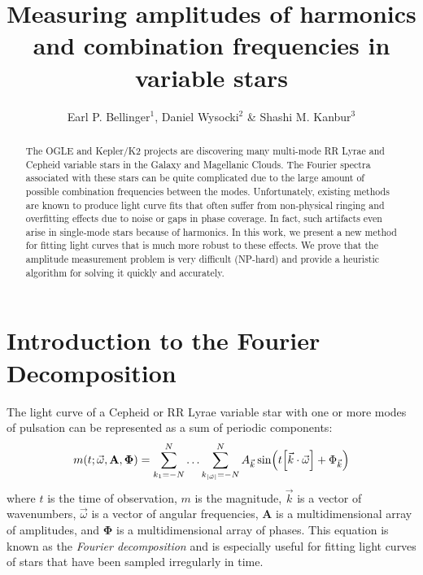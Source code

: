 \documentclass[11pt,twoside]{book}
\begin{document}
\pagestyle{myheadings}
\setcounter{equation}{0}\setcounter{figure}{0}\setcounter{footnote}{0}\setcounter{section}{0}\setcounter{table}{0}\setcounter{page}{1}
\title{Measuring amplitudes of harmonics and combination frequencies in variable stars}
\author{Earl P. Bellinger$^1$, Daniel Wysocki$^2$ \& Shashi M. Kanbur$^3$}

\begin{abstract}
The OGLE and Kepler/K2 projects are discovering many multi-mode RR Lyrae and Cepheid variable stars in the Galaxy and Magellanic Clouds. The Fourier spectra associated with these stars can be quite complicated due to the large amount of possible combination frequencies between the modes. Unfortunately, existing methods are known to produce light curve fits that often suffer from non-physical ringing and overfitting effects due to noise or gaps in phase coverage. In fact, such artifacts even arise in single-mode stars because of harmonics. In this work, we present a new method for fitting light curves that is much more robust to these effects. We prove that the amplitude measurement problem is very difficult (NP-hard) and provide a heuristic algorithm for solving it quickly and accurately. 
\end{abstract}

\section{Introduction to the Fourier Decomposition}
The light curve of a Cepheid or RR Lyrae variable star with one or more modes of pulsation can be represented as a sum of periodic components:
\begin{equation}
    m(t ; \vec \omega, \mathbf A, \boldsymbol \Phi) = \sum_{k_1={-N}}^N \ldots \sum_{k_{|\vec \omega|}={-N}}^N A_{\vec k} \sin(t\qty[\vec k\cdot \vec \omega] + \Phi_{\vec k})
\end{equation}
where $t$ is the time of observation, $m$ is the magnitude, $\vec k$ is a vector of wavenumbers, $\vec \omega$ is a vector of angular frequencies, $\mathbf A$ is a multidimensional array of amplitudes, and $\boldsymbol \Phi$ is a multidimensional array of phases. This equation is known as the \emph{Fourier decomposition} and is especially useful for fitting light curves of stars that have been sampled irregularly in time. 
\end{document}
